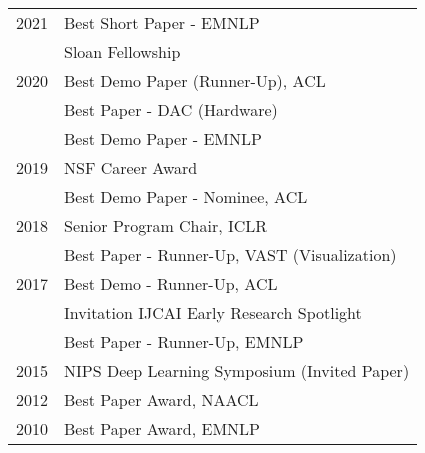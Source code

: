 \documentclass[10pt]{article}
\begin{document}
{\bigskip
{}
\hspace{-1cm} \begin{tabular}{lp{11.5cm}}
2021 & Best Short Paper -  EMNLP \\
     & Sloan Fellowship\\
2020 & Best Demo Paper (Runner-Up), ACL   \\
& Best Paper - DAC (Hardware)  \\
& Best Demo Paper - EMNLP  \\
2019 & NSF Career Award \\
& Best Demo Paper - Nominee, ACL   \\
2018 & Senior Program Chair, ICLR  \\
& Best Paper - Runner-Up, VAST (Visualization)  \\
2017 & Best Demo  - Runner-Up, ACL  \\
 & Invitation IJCAI Early Research Spotlight \\
& Best Paper - Runner-Up, EMNLP \\
2015 & NIPS Deep Learning Symposium (Invited Paper)   \\
2012 & Best Paper Award, NAACL \\
2010 & Best Paper Award, EMNLP \\
\end{tabular}












}
\end{document}
